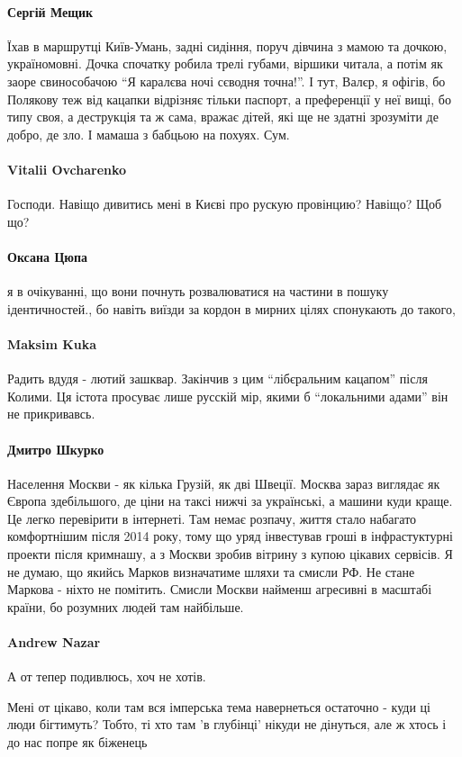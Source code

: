 \paragraph{Сергій Мещик}

Їхав в маршрутці Київ-Умань, задні сидіння, поруч дівчина з мамою та дочкою,
україномовні. Дочка спочатку робила трелі губами, віршики читала, а потім як
заоре свинособачою \enquote{Я каралєва ночі сєводня точна!}. І тут, Валєр, я офігів, бо
Полякову теж від кацапки відрізняє тільки паспорт, а преференції у неї вищі, бо
типу своя, а деструкція та ж сама, вражає дітей, які ще не здатні зрозуміти де
добро, де зло. І мамаша з бабцьою на похуях. Сум.

\paragraph{Vitalii Ovcharenko}
Господи. Навіщо дивитись мені в Києві про рускую провінцию? Навіщо? Щоб що? 

\paragraph{Оксана Цюпа}

я в очікуванні, що вони почнуть розвалюватися на частини в пошуку
ідентичностей., бо навіть виїзди за кордон в мирних цілях спонукають до такого, 

\paragraph{Maksim Kuka}

Радить вдудя - лютий зашквар. Закінчив з цим \enquote{лібєральним кацапом} після
Колими. Ця істота просуває лише русскій мір, якими б \enquote{локальними адами} він не
прикривавсь.

\paragraph{Дмитро Шкурко}

Населення Москви - як кілька Грузій, як дві Швеції. Москва зараз виглядає як
Європа здебільшого, де ціни на таксі нижчі за українські, а машини куди краще.
Це легко перевірити в інтернеті. Там немає розпачу, життя стало набагато
комфортнішим після 2014 року, тому що уряд інвестував гроші в інфрастуктурні
проекти після кримнашу, а з Москви зробив вітрину з купою цікавих сервісів. Я
не думаю, що якийсь Марков визначатиме шляхи та смисли РФ. Не стане Маркова -
ніхто не помітить. Смисли Москви найменш агресивні в масштабі країни, бо
розумних людей там найбільше.

\paragraph{Andrew Nazar}

А от тепер подивлюсь, хоч не хотів.

Мені от цікаво, коли там вся імперська тема навернеться остаточно - куди ці
люди бігтимуть? Тобто, ті хто там 'в глубінці' нікуди не дінуться, але ж хтось
і до нас попре як біженець
